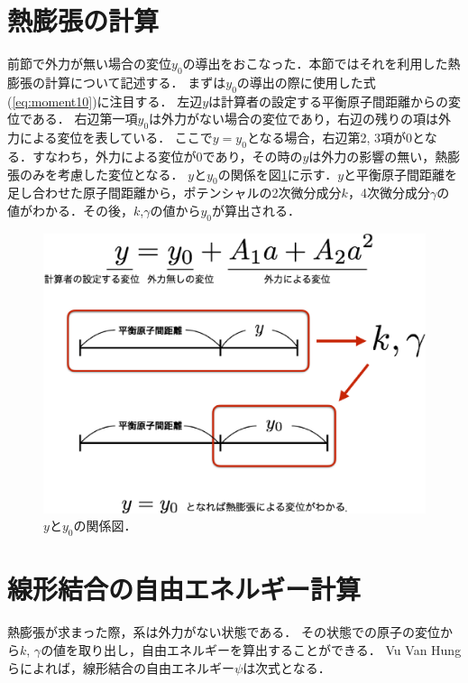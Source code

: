 \section{熱膨張の計算}
\label{sec:heatexpantion} 
前節で外力が無い場合の変位$y_0$の導出をおこなった．本節ではそれを利用した熱膨張の計算について記述する．
まずは$y_0$の導出の際に使用した式(\ref{eq:moment10})に注目する．
左辺$y$は計算者の設定する平衡原子間距離からの変位である．
右辺第一項$y_0$は外力がない場合の変位であり，右辺の残りの項は外力による変位を表している．
ここで$y=y_0$となる場合，右辺第2, 3項が0となる．すなわち，外力による変位が0であり，その時の$y$は外力の影響の無い，熱膨張のみを考慮した変位となる．
$y$と$y_0$の関係を図\ref{fig:yy0}に示す．$y$と平衡原子間距離を足し合わせた原子間距離から，ポテンシャルの2次微分成分$k$，4次微分成分$\gamma$の値がわかる．その後，$k$,$\gamma$の値から$y_0$が算出される．

\begin{figure}[htbp]
 \begin{center}
  \includegraphics[width=130mm]{../image/fig1.eps}
 \end{center}
 \caption{$y$と$y_0$の関係図．}
 \label{fig:yy0}
\end{figure}


\section{線形結合の自由エネルギー計算}
熱膨張が求まった際，系は外力がない状態である．
その状態での原子の変位から$k$, $\gamma$の値を取り出し，自由エネルギーを算出することができる．
Vu Van Hungらによれば，線形結合の自由エネルギー$\psi$は次式となる\cite[p.515]{jindo2}．

